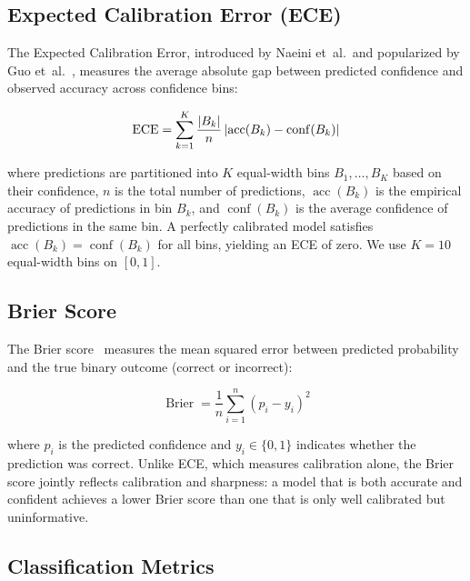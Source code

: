 \subsection{Expected Calibration Error (ECE)}
\label{subsec:met-ece}

The Expected Calibration Error, introduced by Naeini et~al.\ and 
popularized by Guo et~al.~\cite{guo2017calibration}, measures the average 
absolute gap between predicted confidence and observed accuracy across 
confidence bins:

\begin{equation}
    \textrm{ECE} = \sum_{k=1}^{K} \frac{|B_k|}{n}
    \left| \operatorname{acc}(B_k) - \operatorname{conf}(B_k) \right|
    \label{eq:ece}
\end{equation}

where predictions are partitioned into $K$ equal-width bins $B_1, \ldots, 
B_K$ based on their confidence, $n$ is the total number of predictions, 
$\operatorname{acc}(B_k)$ is the empirical accuracy of predictions in 
bin $B_k$, and $\operatorname{conf}(B_k)$ is the average confidence of 
predictions in the same bin. A perfectly calibrated model satisfies 
$\operatorname{acc}(B_k) = \operatorname{conf}(B_k)$ for all bins, yielding 
an ECE of zero. We use $K = 10$ equal-width bins on $[0, 1]$.

\subsection{Brier Score}
\label{subsec:met-brier}

The Brier score~\cite{brier1950} measures the mean squared error between 
predicted probability and the true binary outcome (correct or incorrect):

\begin{equation}
    \operatorname{Brier} = \frac{1}{n} \sum_{i=1}^{n}
    \left( p_i - y_i \right)^2
    \label{eq:brier}
\end{equation}

where $p_i$ is the predicted confidence and $y_i \in \{0, 1\}$ indicates 
whether the prediction was correct. Unlike ECE, which measures calibration 
alone, the Brier score jointly reflects calibration and sharpness: a model 
that is both accurate and confident achieves a lower Brier score than one 
that is only well calibrated but uninformative.

\subsection{Classification Metrics}
\label{subsec:met-classification}

